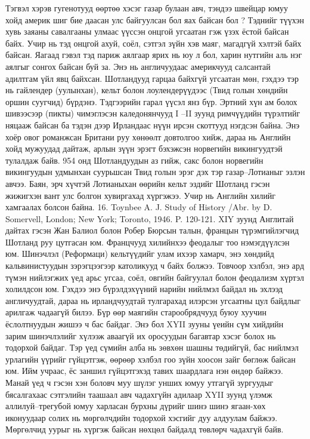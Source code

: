 Тэгвэл хэрэв гугенотууд өөртөө хэсэг газар булаан авч, тэндээ швейцар юмуу хойд америк шиг бие даасан улс байгуулсан бол яах байсан бол ? Тэднийг түүхэн хувь заяаны савалгааны улмаас үүссэн онцгой угсаатан гэж үзэх ёстой байсан байх. Учир нь тэд онцгой ахуй, соёл, сэтгэл зүйн хэв маяг, магадгүй хэлтэй байх байсан. Яагаад гэвэл тэд париж аялгаар ярих нь юу л бол, харин нутгийн аль нэг аялгыг сонгох байсан буй за. Энэ нь англичуудаас америкчууд салсантай адилтгам үйл явц байхсан.
Шотландууд гарцаа байхгүй угсаатан мөн, гэхдээ тэр нь гайлендер (уулынхан), кельт болон лоулендерүүдээс (Твид голын хөндийн оршин суугчид) бүрдэнэ. Тэдгээрийн гарал үүсэл янз бүр. Эртний хүн ам болох шивээсээр (пикты) чимэглэсэн каледонянчууд I –II зуунд римчүүдийн түрэлтийг няцааж байсан ба тэдэн дээр Ирландаас нүүн ирсэн скоттууд нэгдсэн байна. Энэ хоёр овог романжсан Британи руу хөнөөлт довтолгоо хийж, дараа нь Английн хойд мужуудад дайтаж, арлын зүүн эрэгт бэхэжсэн норвегийн викингуудтэй тулалдаж байв. 954 онд Шотландуудын аз гийж, сакс болон норвегийн викингуудын удмынхан суурьшсан Твид голын эрэг дэх тэр газар–Лотианыг эзлэн авчээ. Баян, эрч хүчтэй Лотианыхан өөрийн кельт эздийг Шотланд гэсэн жижигхэн вант улс болгон хувиргахад хүргэжээ. Учир нь Английн хилийг хамгаалах болсон байна. 16. Toynbee A. J. Study of History /Abr. by D. Somervell, London; New York; Toronto, 1946. P. 120-121.
XIY зуунд Англитай дайтах гэсэн Жан Балиол болон Робер Бюрсын талын, францын түрэмгийлэгчид Шотланд руу цутгасан юм. Францчууд хилийнхээ феодалыг тоо нэмэгдүүлсэн юм. Шинэчлэл (Реформаци) кельтүүдийг улам ихээр хамарч, энэ хөндийд кальвинистуудын зэрэгцээгээр католикууд ч байх болжээ. Товчоор хэлбэл, энэ ард түмэн нийлэгжих үед арьс угсаа, соёл, овгийн байгуулал болон феодализм хүртэл холилдсон юм. Гэхдээ энэ бүрэлдэхүүний нарийн нийлмэл байдал нь эхлээд англичуудтай, дараа нь ирландчуудтай тулгарахад илэрсэн угсаатны цул байдлыг арилгаж чадаагүй билээ.
Бүр өөр маягийн старообрядчууд буюу хуучин ёслолтнуудын жишээ ч бас байдаг. Энэ бол XYII зууны үеийн сүм хийдийн зарим шинэчлэлийг хүлээж аваагүй их оросуудын багавтар хэсэг болох нь тодорхой байдаг. Тэр үед сүмийн алба нь зөвхөн шашны төдийгүй, бас нийлмэл урлагийн үүрийг гүйцэтгэж, өөрөөр хэлбэл гоо зүйн хоосон зайг бөглөж байсан юм. Ийм учраас, ёс заншил гүйцэтгэхэд тавих шаардлага нэн өндөр байжээ. Манай үед ч гэсэн хэн боловч муу шүлэг унших юмуу утгагүй зургуудыг бясалгахаас сэтгэлийн таашаал авч чадахгүйн адилаар XYII зуунд үлэмж аллилуй–трегубой юмуу харласан бурхны дүрийг шинэ шинэ ягаан-хөх иконуудаар солих нь мөргөлчдийн тодорхой хэсгийг дуу алдуулам байжээ. Мөргөлчид уурыг нь хүргэж байсан нөхцөл байдалд төвлөрч чадахгүй байв.
